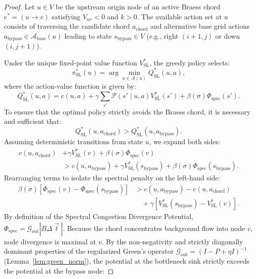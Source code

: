 \documentclass[11pt,a4paper]{article}
\begin{document}
\begin{proof}
Let $u \in V$ be the upstream origin node of an active Braess chord $e^* = (u \to v)$ satisfying $V_{uv} < 0$ and $k > 0$. The available action set at $u$ consists of traversing the candidate chord $a_{\text{chord}}$ and alternative base grid actions $a_{\text{bypass}} \in \mathcal{A}_{\text{base}}(u)$ leading to state $s_{\text{bypass}} \in V$ (e.g., right $(i+1, j)$ or down $(i, j+1)$).

Under the unique fixed-point value function $V_{\text{SL}}^*$, the greedy policy selects:
\begin{equation}
\pi_{\text{SL}}^*(u) = \arg\min_{a \in \mathcal{A}(u)} Q_{\text{SL}}^*(u, a),
\end{equation}
where the action-value function is given by:
\begin{equation}
Q_{\text{SL}}^*(u, a) = c(u, a) + \gamma \sum_{s'} \mathcal{P}(s' \mid u, a) V_{\text{SL}}^*(s') + \beta(\sigma) \Phi_{\text{spec}}(s').
\end{equation}
To ensure that the optimal policy strictly avoids the Braess chord, it is necessary and sufficient that:
\begin{equation}
Q_{\text{SL}}^*(u, a_{\text{chord}}) > Q_{\text{SL}}^*(u, a_{\text{bypass}}).
\end{equation}
Assuming deterministic transitions from state $u$, we expand both sides:
\begin{equation}
\begin{split}
c(u, a_{\text{chord}}) &+ \gamma V_{\text{SL}}^*(v) + \beta(\sigma) \Phi_{\text{spec}}(v) \\
&> c(u, a_{\text{bypass}}) + \gamma V_{\text{SL}}^*(s_{\text{bypass}}) + \beta(\sigma) \Phi_{\text{spec}}(s_{\text{bypass}}).
\end{split}
\end{equation}
Rearranging terms to isolate the spectral penalty on the left-hand side:
\begin{equation}
\begin{split}
\beta(\sigma) \left[ \Phi_{\text{spec}}(v) - \Phi_{\text{spec}}(s_{\text{bypass}}) \right] &> c(u, a_{\text{bypass}}) - c(u, a_{\text{chord}}) \\
&\quad + \gamma \left[ V_{\text{SL}}^*(s_{\text{bypass}}) - V_{\text{SL}}^*(v) \right].
\end{split}
\end{equation}
By definition of the Spectral Congestion Divergence Potential, $\Phi_{\text{spec}} = \mathcal{G}_{\text{out}} |B \Delta \vec{\ell}|$. Because the chord concentrates background flow into node $v$, node divergence is maximal at $v$. By the non-negativity and strictly diagonally dominant properties of the regularized Green's operator $\mathcal{G}_{\text{out}} = (I - P + \eta I)^{-1}$ (Lemma~\ref{lem:green_norm}), the potential at the bottleneck sink strictly exceeds the potential at the bypass node:

\end{proof}
\end{document}
